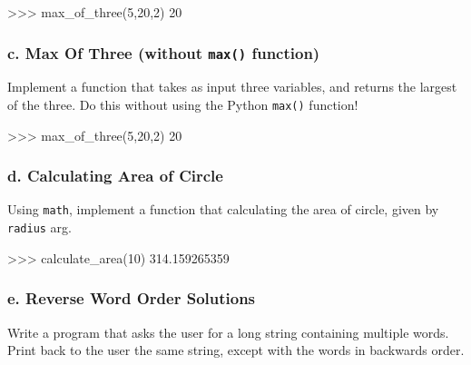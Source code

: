 \documentclass[11pt]{article}
\newenvironment{Shaded}{}{}
\newcommand{\DecValTok}[1]{\textcolor[rgb]{0.25,0.63,0.44}{{#1}}}
\newcommand{\FloatTok}[1]{\textcolor[rgb]{0.25,0.63,0.44}{{#1}}}
\newcommand{\NormalTok}[1]{{#1}}
\newcommand{\OperatorTok}[1]{\textcolor[rgb]{0.40,0.40,0.40}{{#1}}}
\begin{document}
\begin{Shaded}
\begin{Highlighting}[]
\OperatorTok{>>>}\NormalTok{ max_of_three(}\DecValTok{5}\NormalTok{,}\DecValTok{20}\NormalTok{,}\DecValTok{2}\NormalTok{) }
\DecValTok{20}
\end{Highlighting}
\end{Shaded}

\subsubsection{\texorpdfstring{c. Max Of Three (without \texttt{max()}
function)}{c. Max Of Three (without max() function)}}\label{c.-max-of-three-without-max-function}

Implement a function that takes as input three variables, and returns
the largest of the three. Do this without using the Python
\texttt{max()} function!

\begin{Shaded}
\begin{Highlighting}[]
\OperatorTok{>>>}\NormalTok{ max_of_three(}\DecValTok{5}\NormalTok{,}\DecValTok{20}\NormalTok{,}\DecValTok{2}\NormalTok{) }
\DecValTok{20}
\end{Highlighting}
\end{Shaded}

\subsubsection{d. Calculating Area of
Circle}\label{d.-calculating-area-of-circle}

Using \texttt{math}, implement a function that calculating the area of
circle, given by \texttt{radius} arg.

\begin{Shaded}
\begin{Highlighting}[]
\OperatorTok{>>>}\NormalTok{ calculate_area(}\DecValTok{10}\NormalTok{)}
    \FloatTok{314.159265359}
\end{Highlighting}
\end{Shaded}

\subsubsection{e. Reverse Word Order
Solutions}\label{e.-reverse-word-order-solutions}

Write a program that asks the user for a long string containing multiple
words. Print back to the user the same string, except with the words in
backwards order.
\end{document}
